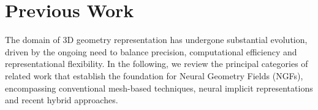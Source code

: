 \section{Previous Work}\label{sec:PreviousWork}
The domain of 3D geometry representation has undergone substantial evolution, driven by the ongoing need to balance precision, computational efficiency and representational flexibility.
In the following, we review the principal categories of related work that establish the foundation for Neural Geometry Fields (NGFs), encompassing conventional mesh-based techniques, neural implicit representations and recent hybrid approaches.





